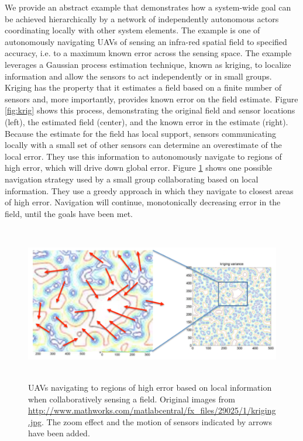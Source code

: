 We provide an abstract example that demonstrates how a system-wide goal can be 
achieved hierarchically by a network of independently autonomous actors coordinating 
locally with other system elements.  The example is one of autonomously navigating UAVs of sensing an infra-red 
spatial field to specified accuracy, i.e. to a maximum known error across the sensing space.
The example leverages a Gaussian process estimation technique, known as kriging, to localize 
information and allow the sensors to act independently or in small groups.  Kriging has the 
property that it estimates a field based on a finite number of sensors and, more importantly, 
provides known error on the field estimate.  Figure \ref{fig:krig} shows this process, demonstrating
the original field and sensor locations (left), the estimated field (center), and the  known error in the
estimate (right).  Because the estimate for the field has local support, sensors communicating locally
with a small set of other sensors can determine an overestimate of the local error.  They use
this information to autonomously navigate to regions of high error, which will drive down global
error.  Figure \ref{fig:krig2} shows one possible navigation strategy used by a small group collaborating 
based on local information.  They use a greedy approach in which they navigate to closest areas 
of high error.   Navigation will continue, monotonically decreasing error in the field, until the 
goals have been met.

\begin{figure}
\begin{center}
\includegraphics[height=2.7in]{krigingd.png} 
\end{center}
\caption{UAVs navigating to regions of high error based on local information when collaboratively sensing a field.
  Original images from {\small \url{http://www.mathworks.com/matlabcentral/fx_files/29025/1/kriging.jpg}}.  The
  zoom effect and the motion of sensors indicated by arrows have been added.} 
\label{fig:krig2}
\end{figure}

